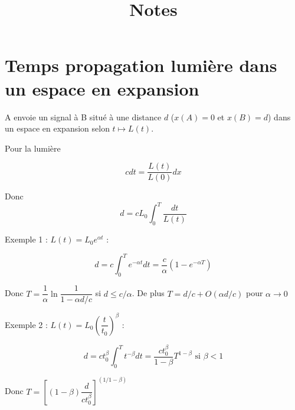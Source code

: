 \documentclass[11pt]{article} %
\title{Notes}
\author{}
\date{} %
\newcommand{\dint}{\displaystyle \int}
\begin{document}
\maketitle

\section{Temps propagation lumière dans un espace en expansion}

A envoie un signal à B situé à une distance $d$ ($x(A) = 0$ et $x(B) = d$) dans un espace en expansion selon $t \mapsto L(t)$. 

Pour la lumière

\begin{equation}
c dt = \dfrac{L(t)}{L(0)} dx
\end{equation}

Donc \begin{equation}
d = cL_0 \dint_0^T \dfrac{dt}{L(t)}
\end{equation}


Exemple 1 : $L(t) = L_0 e^{\alpha t}$ :

 \begin{equation}
d = c \dint_0^T e^{-\alpha t} dt = \dfrac{c}{\alpha} \left ( 1 - e^{-\alpha T} \right )
\end{equation}

Donc $T = \dfrac{1}{\alpha} \ln { \dfrac{1}{1-\alpha d/c}}$ si $d \leq c/\alpha$.
De plus $T = d/c + O(\alpha d/c)$ pour $\alpha \to 0$

Exemple 2 : $L(t) = L_0 \left ( \dfrac{t}{t_0} \right )^\beta$ :

 \begin{equation}
d = c t_0 ^\beta \dint_0^T t^{-\beta} dt = \dfrac{ct_0^\beta} {1-\beta}  T^{1-\beta}  \textrm{ si } \beta < 1
\end{equation}

Donc $T = \left [ (1-\beta) \dfrac{d}{ct_0^\beta} \right ] ^ { (1/1-\beta) }$
\end{document}
